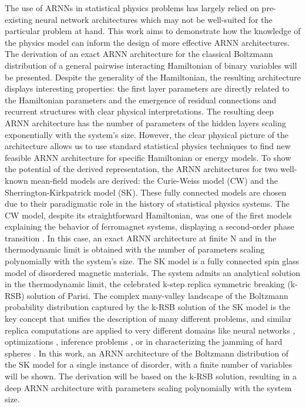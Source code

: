 \documentclass[aps,physrev,10pt,floatfix,reprint]{revtex4-2}
\begin{document}
The use of ARNNs in statistical physics problems has largely relied on pre-existing neural network architectures which may not be well-suited for the particular problem at hand. This work aims to demonstrate how the knowledge of the physics model can inform the design of more effective ARNN architectures. The derivation of an exact ARNN architecture for the classical Boltzmann distribution of a general pairwise interacting Hamiltonian of binary variables will be presented. Despite the generality of the Hamiltonian, the resulting architecture displays interesting properties: the first layer parameters are directly related to the Hamiltonian parameters and the emergence of residual connections and recurrent structures with clear physical interpretations.
The resulting deep ARNN architecture has the number of parameters of the hidden layers scaling exponentially with the system's size. 
However, the clear physical picture of the architecture allows us to use standard statistical physics techniques to find new feasible ARNN architecture for specific Hamiltonian or energy models. To show the potential of the derived representation, the ARNN architectures for two well-known mean-field models are derived: the Curie-Weiss model (CW) and the Sherrington-Kirkpatrick model (SK). These fully connected models are chosen due to their paradigmatic role in the history of statistical physics systems. The CW model, despite its straightforward Hamiltonian, was one of the first models explaining the behavior of ferromagnet systems, displaying a second-order phase transition \cite{kadanoff2000statistical}. In this case, an exact ARNN architecture at finite N and in the thermodynamic limit is obtained with the number of parameters scaling polynomially with the system's size. 
The SK model \cite{PhysRevLett.35.1792} is a fully connected spin glass model of disordered magnetic materials. The system admits an analytical solution in the thermodynamic limit, the celebrated \cite{Nobel2021} k-step replica symmetric breaking (k-RSB) solution \cite{PARISI1979203, PhysRevLett.43.1754} of Parisi. The complex many-valley landscape of the Boltzmann probability distribution captured by the k-RSB solution of the SK model is the key concept that unifies the description of many different problems, and similar replica computations are applied to very different domains like neural networks \cite{Gardner_1987, PhysRevLett.55.1530}, optimizations \cite{doi:10.1126/science.1073287}, inference problems \cite{doi:10.1080/00018732.2016.1211393}, or in characterizing the jamming of hard spheres \cite{RevModPhys.82.789, PhysRevLett.102.195701}. In this work, an ARNN architecture of the Boltzmann distribution of the SK model for a single instance of disorder, with a finite number of variables will be shown. The derivation will be based on the k-RSB solution, resulting in a deep ARNN architecture with parameters scaling polynomially with the system size. 
            
\end{document}

